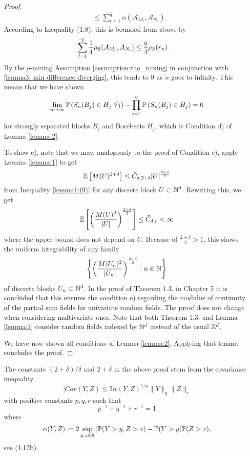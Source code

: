 \begin{proof}
\begin{align*}
        & \leq \sum\limits_{l=1}^q \alpha(\mathcal{A}_{M_l}, \mathcal{A}_{N_l}).
    \end{align*}
    According to \cite{bradley1986basic} Inequality (1.8), this is bounded from above by
    \begin{align*}
        \sum\limits_{l=1}^q  \frac{1}{4} \rho_{\mathbb{R}}(\mathcal{A}_{M_l}, \mathcal{A}_{N_l}) 
        & \leq \frac{q}{4} \rho_{\mathbb{R}}(r_n).
    \end{align*}
    By the $\rho$-mixing Assumption \ref{assumption:rho_mixing} in conjunction with \eqref{lemma3: min difference diverging}, this tends to $0$ as $n$ goes to infinity. This means that we have shown 
    \[ \lim\limits_{n \to \infty} \mathbb{P}\left( S_n(B_j) \in H_j \ \forall j \right) - \prod\limits_{j=1}^q \mathbb{P}\left(S_n(B_j) \in H_j\right) = 0 \]
    for strongly separated blocks $B_j$ and Borel-sets $H_j$, which is Condition d) of Lemma \ref{lemma:2}.

    To show e), note that we may, analogously to the proof of Condition c), apply Lemma \ref{lemma:1} to get
    \[ \mathbb{E}\left[M(U)^{2+\delta}\right] \leq \Tilde{C}_{d, 2+\delta} |U|^{\frac{2+\delta}{2}} \]
    from Inequality \eqref{lemma1:(9)} for any discrete block $U \subset \mathbb{N}^d$. Rewriting this, we get
    \[ \mathbb{E}\left[\left(\frac{M(U)^2}{|U|}\right)^{\frac{2+\delta}{2}}\right] \leq \Tilde{C}_{d, r} < \infty \]
    where the upper bound does not depend on $U$. Because of $\frac{2+\delta}{2} > 1$, this shows the uniform integrability of any family
    \[  \left\{\left(\frac{M(U_n)^2}{|U_n|}\right)^{\frac{2+\delta}{2}}: n \in \mathbb{N} \right\} \]
    of discrete blocks $U_n \subset \mathbb{N}^d$. In the proof of \cite{[11]bulinksi2007limittheorems} Theorem 1.3. in Chapter 5 it is concluded that this ensures the condition e) regarding the modulus of continuity of the partial sum fields for univariate random fields. The proof does not change when considering multivariate ones. Note that both \cite{[11]bulinksi2007limittheorems} Theorem 1.3. and Lemma \ref{lemma:1} consider random fields indexed by $\mathbb{N}^d$ instead of the usual $\mathbb{Z}^d$.

    We have now shown all conditions of Lemma \ref{lemma:2}. Applying that lemma concludes the proof.
\end{proof}


\begin{remark}
    The constants $(2+\delta)/\delta$ and $2+\delta$ in the above proof stem from the covariance inequality
    \[ |Cov(Y, Z) \leq 2 \alpha(Y, Z)^{1/p} \|Y\|_q \|Z\|_r \]
    with positive constants $p, q, r$ such that 
    \[ p^{-1} + q^{-1} + r^{-1} = 1 \]
    where
    \[ \alpha(Y, Z) \coloneqq 2 \sup\limits_{y, z \in \mathbb{R}} | \mathbb{P}(Y > y, Z > z) - \mathbb{P}(Y > y)\mathbb{P}(Z > z), \]
    see \cite{[46]rio2013inequalities} (1.12b).
\end{remark}
